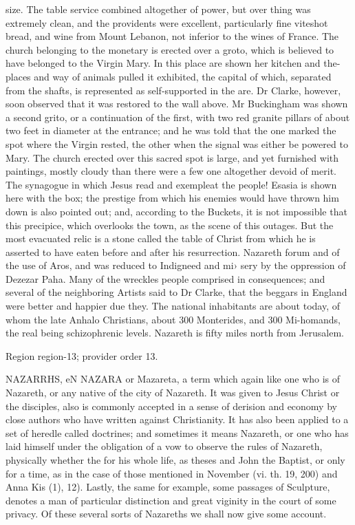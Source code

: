 \documentclass[11pt]{article}
\begin{document}
size. The table service combined altogether of power, but over thing was extremely clean, and the providents were excellent, particularly fine viteshot bread, and wine from Mount Lebanon, not inferior to the wines of France. The church belonging to the monetary is erected over a groto, which is believed to have belonged to the Virgin Mary. In this place are shown her kitchen and the-places and way of animals pulled it exhibited, the capital of which, separated from the shafts, is represented as self-supported in the are. Dr Clarke, however, soon observed that it was restored to the wall above. Mr Buckingham was shown a second grito, or a continuation of the first, with two red granite pillars of about two feet in diameter at the entrance; and he was told that the one marked the spot where the Virgin rested, the other when the signal was either be powered to Mary. The church erected over this sacred spot is large, and yet furnished with paintings, mostly cloudy than there were a few one altogether devoid of merit. The synagogue in which Jesus read and exempleat the people! Esasia is shown here with the box; the prestige from which his enemies would have thrown him down is also pointed out; and, according to the Buckets, it is not impossible that this precipice, which overlooks the town, as the scene of this outages. But the most evacuated relic is a stone called the table of Christ from which he is asserted to have eaten before and after his resurrection. Nazareth forum and of the use of Aros, and was reduced to Indigneed and mi› sery by the oppression of Dezezar Paha. Many of the wreckles people comprised in consequences; and several of the neighboring Artists said to Dr Clarke, that the beggars in England were better and happier due they. The national inhabitants are about today, of whom the late Anhalo Christians, about 300 Monterides, and 300 Mi-homands, the real being schizophrenic levels. Nazareth is fifty miles north from Jerusalem.
\par

{\scriptsize\color{gray} Region region-13; provider order 13.\par}
\medskip

NAZARRHS, eN NAZARA or Mazareta, a term which again like one who is of Nazareth, or any native of the city of Nazareth. It was given to Jesus Christ or the disciples, also is commonly accepted in a sense of derision and economy by close authors who have written against Christianity. It has also been applied to a set of heredle called doctrines; and sometimes it means Nazareth, or one who has laid himself under the obligation of a vow to observe the rules of Nazareth, physically whether the for his whole life, as theses and John the Baptist, or only for a time, as in the case of those mentioned in November (vi. th. 19, 200) and Anna Kis (1), 12). Lastly, the same for example, some passages of Sculpture, denotes a man of particular distinction and great viginity in the court of some privacy. Of these several sorts of Nazareths we shall now give some account.
\par
\end{document}
